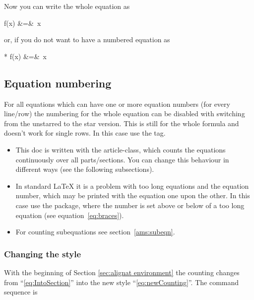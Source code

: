 \makeatletter
\newcommand{\be}{%
    \begingroup
    \eqnarray%
	\@ifstar{\nonumber}{}%
}
\newcommand{\ee}{\endeqnarray\endgroup}
\makeatother

Now you can write the whole equation as


\begin{LTXexample}[width=0.5\columnwidth,wide]
\be
  f(x) &=& \int{}\,x
\ee
\end{LTXexample}

\medskip
\noindent or, if you do not want to have a numbered equation as

\begin{LTXexample}[width=0.5\columnwidth,wide]
\be*
  f(x) &=& \int{}\,x
\ee
\end{LTXexample}


\subsection{Equation numbering}\label{sub:Equationnumbering}

For all equations which can have one or %
more equation numbers (for every line/row) the numbering
for the whole equation can be disabled with switching from the unstarred to the star
version. This is still for the whole formula and doesn't work for single rows.
In this case use the  tag.

\begin{itemize}
\item This doc is written with the article-class, which counts the equations
continuously over all parts/sections. You can change this behaviour
in different ways (see the following subsections).
\item In standard \LaTeX{} it is a problem with too long equations and the
equation number, which may be printed with the equation one upon the other. In this case
use the \AmSmath package, where the number is set above or below
of a too long equation (see equation~\vref{eq:braces}).
\item For counting subequations see section~\vref{ams:subeqn}.
\end{itemize}

\subsubsection{Changing the style}

%
With the beginning of Section \vref{sec:alignat environment} the
counting changes from ``\ref{eq:IntoSection}{}'' into the new style
``\ref{eq:newCounting}''. The command sequence is

